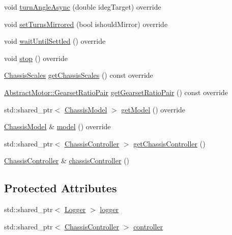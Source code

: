 \begin{DoxyCompactItemize}
\item 
void \mbox{\hyperlink{classokapi_1_1DefaultOdomChassisController_a948978204fc6f2a2443025dfdb0241b1}{turn\+Angle\+Async}} (double ideg\+Target) override
\item 
void \mbox{\hyperlink{classokapi_1_1DefaultOdomChassisController_aed92ba0b7a9fc15bf645f3789e8598ae}{set\+Turns\+Mirrored}} (bool ishould\+Mirror) override
\item 
void \mbox{\hyperlink{classokapi_1_1DefaultOdomChassisController_a44599379129060bdb44e6f603ee5777b}{wait\+Until\+Settled}} () override
\item 
void \mbox{\hyperlink{classokapi_1_1DefaultOdomChassisController_af6a98415e2c4e17dfec77e215efb1a41}{stop}} () override
\item 
\mbox{\hyperlink{classokapi_1_1ChassisScales}{Chassis\+Scales}} \mbox{\hyperlink{classokapi_1_1DefaultOdomChassisController_afa07913b30d47c790fcdce8c2b85a468}{get\+Chassis\+Scales}} () const override
\item 
\mbox{\hyperlink{structokapi_1_1AbstractMotor_1_1GearsetRatioPair}{Abstract\+Motor\+::\+Gearset\+Ratio\+Pair}} \mbox{\hyperlink{classokapi_1_1DefaultOdomChassisController_a6912dbe99776f79fb3a6990e2fbea2ff}{get\+Gearset\+Ratio\+Pair}} () const override
\item 
std\+::shared\+\_\+ptr$<$ \mbox{\hyperlink{classokapi_1_1ChassisModel}{Chassis\+Model}} $>$ \mbox{\hyperlink{classokapi_1_1DefaultOdomChassisController_a83e8bf7115086c331ada990ceb872bf1}{get\+Model}} () override
\item 
\mbox{\hyperlink{classokapi_1_1ChassisModel}{Chassis\+Model}} \& \mbox{\hyperlink{classokapi_1_1DefaultOdomChassisController_aa917086153b6298bf7792fd3b31ac240}{model}} () override
\item 
std\+::shared\+\_\+ptr$<$ \mbox{\hyperlink{classokapi_1_1ChassisController}{Chassis\+Controller}} $>$ \mbox{\hyperlink{classokapi_1_1DefaultOdomChassisController_a2b5fc33c7fbe8d6fd49f4fd46fb84a2d}{get\+Chassis\+Controller}} ()
\item 
\mbox{\hyperlink{classokapi_1_1ChassisController}{Chassis\+Controller}} \& \mbox{\hyperlink{classokapi_1_1DefaultOdomChassisController_add1bed5d02d3da37306ef0016b7ad8a2}{chassis\+Controller}} ()
\end{DoxyCompactItemize}
\subsection*{Protected Attributes}
\begin{DoxyCompactItemize}
\item 
std\+::shared\+\_\+ptr$<$ \mbox{\hyperlink{classokapi_1_1Logger}{Logger}} $>$ \mbox{\hyperlink{classokapi_1_1DefaultOdomChassisController_a1e34483ae1bcef368d80b69f54a3b091}{logger}}
\item 
std\+::shared\+\_\+ptr$<$ \mbox{\hyperlink{classokapi_1_1ChassisController}{Chassis\+Controller}} $>$ \mbox{\hyperlink{classokapi_1_1DefaultOdomChassisController_a0513b32bd09e7af2b82a5d67895b6165}{controller}}
\end{DoxyCompactItemize}
